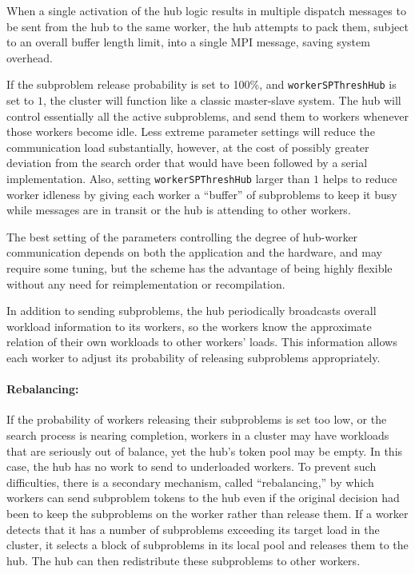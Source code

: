 When a single activation of the hub logic results in multiple
dispatch messages to be sent from the hub to the same worker, the hub
attempts to pack them, subject to an overall buffer length limit, into
a single MPI message, saving system overhead.

If the subproblem release probability is set to 100\%, and
\texttt{workerSPThreshHub} is set to $1$, the cluster will function
like a classic master-slave system.  The hub will control essentially
all the active subproblems, and send them to workers whenever those
workers become idle.  Less extreme parameter settings will reduce the
communication load substantially, however, at the cost of possibly
greater deviation from the search order that would have been followed
by a serial implementation.  Also, setting \texttt{workerSPThreshHub}
larger than $1$ helps to reduce worker idleness by giving each worker
a ``buffer'' of subproblems to keep it busy while messages are in
transit or the hub is attending to other workers.

The best setting of the parameters controlling the degree of
hub-worker communication depends on both the application and the
hardware, and may require some tuning, but the scheme has the advantage of
being highly flexible without any need for reimplementation or recompilation.

In addition to sending subproblems, the hub periodically broadcasts
overall workload information to its workers, so the workers know the
approximate relation of their own workloads to other workers' loads.  This
information allows each worker to adjust its probability of releasing
subproblems appropriately.

\paragraph{Rebalancing:}
If the probability of workers releasing their subproblems is set too
low, or the search process is nearing completion, 
workers in a cluster may have workloads that are
seriously out of balance, yet the hub's token pool may be empty.  In this
case, the hub has no work to send to underloaded workers.  To prevent
such difficulties, there is a secondary mechanism, called
``rebalancing,'' by which workers can send subproblem tokens to the
hub even if the original decision had been to keep the subproblems on the worker
rather than release them.  
If a worker detects that it has a number of subproblems
exceeding its target load in the cluster, it selects a block of subproblems in
its local pool and releases them to the hub.  The hub can then
redistribute these subproblems to other workers.  

